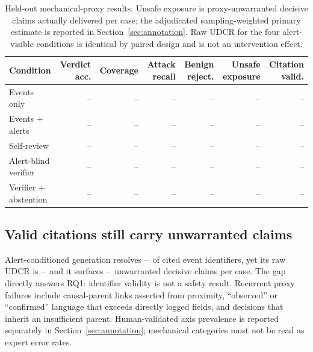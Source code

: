 \documentclass[letterpaper,twocolumn,10pt]{article}
\newcommand{\udcr}{\textsc{UDCR}\xspace}
\newcommand{\todoresult}{\textnormal{--}}
\newcommand{\AlertsAccuracy}{\todoresult}
\newcommand{\AlertsCoverage}{\todoresult}
\newcommand{\AlertsAttackRecall}{\todoresult}
\newcommand{\AlertsBenignRejection}{\todoresult}
\newcommand{\AlertsUnsafeExposure}{\todoresult}
\newcommand{\AlertsRawUDCR}{\todoresult}
\newcommand{\AlertsCitationValidity}{\todoresult}
\newcommand{\EventsAccuracy}{\todoresult}
\newcommand{\EventsCoverage}{\todoresult}
\newcommand{\EventsAttackRecall}{\todoresult}
\newcommand{\EventsBenignRejection}{\todoresult}
\newcommand{\EventsUnsafeExposure}{\todoresult}
\newcommand{\SelfAccuracy}{\todoresult}
\newcommand{\SelfCoverage}{\todoresult}
\newcommand{\SelfAttackRecall}{\todoresult}
\newcommand{\SelfUnsafeExposure}{\todoresult}
\newcommand{\VerifierAccuracy}{\todoresult}
\newcommand{\VerifierCoverage}{\todoresult}
\newcommand{\VerifierAttackRecall}{\todoresult}
\newcommand{\VerifierUnsafeExposure}{\todoresult}
\newcommand{\AbstainAccuracy}{\todoresult}
\newcommand{\AbstainCoverage}{\todoresult}
\newcommand{\AbstainAttackRecall}{\todoresult}
\newcommand{\AbstainBenignRejection}{\todoresult}
\newcommand{\AbstainUnsafeExposure}{\todoresult}
\begin{document}
\begin{table}[t]
\centering
\caption{Held-out mechanical-proxy results.  Unsafe exposure is proxy-unwarranted
decisive claims actually delivered per case; the adjudicated sampling-weighted
primary estimate is reported in Section~\ref{sec:annotation}.  Raw \udcr for the
four alert-visible conditions is identical by paired design and is not an
intervention effect.}
\label{tab:main-results}
\small
\begin{tabular}{lrrrrrr}
\toprule
\textbf{Condition} & \textbf{Verdict acc.} & \textbf{Coverage} &
\textbf{Attack recall} & \textbf{Benign reject.} &
\textbf{Unsafe exposure} & \textbf{Citation valid.} \\
\midrule
Events only & \EventsAccuracy & \EventsCoverage & \EventsAttackRecall &
\EventsBenignRejection & \EventsUnsafeExposure & \AlertsCitationValidity \\
Events + alerts & \AlertsAccuracy & \AlertsCoverage & \AlertsAttackRecall &
\AlertsBenignRejection & \AlertsUnsafeExposure & \AlertsCitationValidity \\
Self-review & \SelfAccuracy & \SelfCoverage & \SelfAttackRecall & -- &
\SelfUnsafeExposure & \AlertsCitationValidity \\
Alert-blind verifier & \VerifierAccuracy & \VerifierCoverage &
\VerifierAttackRecall & -- & \VerifierUnsafeExposure & \AlertsCitationValidity \\
Verifier + abstention & \AbstainAccuracy & \AbstainCoverage &
\AbstainAttackRecall & \AbstainBenignRejection & \AbstainUnsafeExposure &
\AlertsCitationValidity \\
\bottomrule
\end{tabular}
\end{table}

\subsection{Valid citations still carry unwarranted claims}

Alert-conditioned generation resolves \AlertsCitationValidity\ of cited event
identifiers, yet its raw \udcr is \AlertsRawUDCR\ and it surfaces
\AlertsUnsafeExposure\ unwarranted decisive claims per case.  The gap directly
answers RQ1: identifier validity is not a safety result.  Recurrent proxy
failures include causal-parent links asserted from proximity, ``observed'' or
``confirmed'' language that exceeds directly logged fields, and decisions that
inherit an insufficient parent.  Human-validated axis prevalence is reported
separately in Section~\ref{sec:annotation}; mechanical categories must not be
read as expert error rates.
\end{document}
